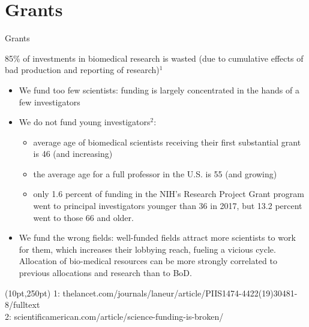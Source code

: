 \documentclass{beamer}
\begin{document}

\section{Grants}
\begin{frame}{Grants}

	85\% of investments in biomedical research is wasted (due to cumulative effects of bad production and reporting of research)$^{1}$

	\begin{itemize}
		\item<2-> We fund too few scientists: funding is largely concentrated in the hands of a few investigators
		\item<3-> We do not fund young investigators$^{2}$: 
		\begin{itemize}
			\item<4-> average age of biomedical scientists receiving their first substantial grant is 46 (and increasing) 
			\item<5-> the average age for a full professor in the U.S. is 55 (and growing)
			\item<6-> only 1.6 percent of funding in the NIH's Research Project Grant program went to principal investigators younger than 36 in 2017, but 13.2 percent went to those 66 and older.
		\end{itemize}
		\item<7-> We fund the wrong fields: well-funded fields attract more scientists to work for them, which increases their lobbying reach, fueling a vicious cycle. Allocation of bio-medical resources can be more strongly correlated to previous allocations and research than to BoD.
	\end{itemize}
	

	\begin{textblock*}{300pt}(10pt,250pt)
		\tiny{1: thelancet.com/journals/laneur/article/PIIS1474-4422(19)30481-8/fulltext \\ 2: scientificamerican.com/article/science-funding-is-broken/}

	\end{textblock*}
	
\end{frame}
\end{document}
